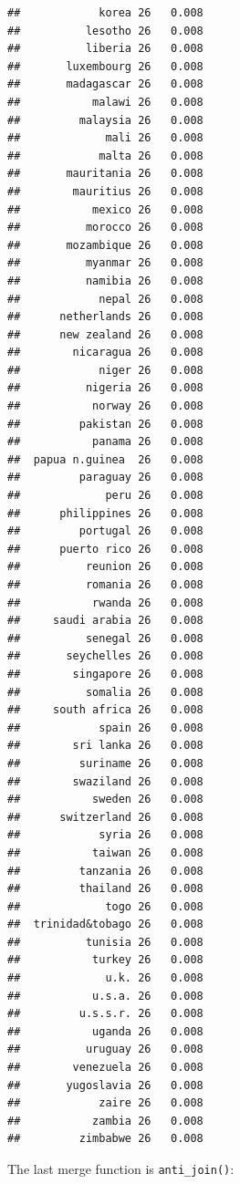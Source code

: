 \documentclass[]{gitbook}
\newenvironment{Shaded}{\begin{snugshade}}{\end{snugshade}}
\newcommand{\DataTypeTok}[1]{\textcolor[rgb]{0.13,0.29,0.53}{#1}}
\newcommand{\KeywordTok}[1]{\textcolor[rgb]{0.13,0.29,0.53}{\textbf{#1}}}
\newcommand{\NormalTok}[1]{#1}
\newcommand{\OperatorTok}[1]{\textcolor[rgb]{0.81,0.36,0.00}{\textbf{#1}}}
\newcommand{\StringTok}[1]{\textcolor[rgb]{0.31,0.60,0.02}{#1}}
\begin{document}
\begin{verbatim}
##            korea 26   0.008
##          lesotho 26   0.008
##          liberia 26   0.008
##       luxembourg 26   0.008
##       madagascar 26   0.008
##           malawi 26   0.008
##         malaysia 26   0.008
##             mali 26   0.008
##            malta 26   0.008
##       mauritania 26   0.008
##        mauritius 26   0.008
##           mexico 26   0.008
##          morocco 26   0.008
##       mozambique 26   0.008
##          myanmar 26   0.008
##          namibia 26   0.008
##            nepal 26   0.008
##      netherlands 26   0.008
##      new zealand 26   0.008
##        nicaragua 26   0.008
##            niger 26   0.008
##          nigeria 26   0.008
##           norway 26   0.008
##         pakistan 26   0.008
##           panama 26   0.008
##  papua n.guinea  26   0.008
##         paraguay 26   0.008
##             peru 26   0.008
##      philippines 26   0.008
##         portugal 26   0.008
##      puerto rico 26   0.008
##          reunion 26   0.008
##          romania 26   0.008
##           rwanda 26   0.008
##     saudi arabia 26   0.008
##          senegal 26   0.008
##       seychelles 26   0.008
##        singapore 26   0.008
##          somalia 26   0.008
##     south africa 26   0.008
##            spain 26   0.008
##        sri lanka 26   0.008
##         suriname 26   0.008
##        swaziland 26   0.008
##           sweden 26   0.008
##      switzerland 26   0.008
##            syria 26   0.008
##           taiwan 26   0.008
##         tanzania 26   0.008
##         thailand 26   0.008
##             togo 26   0.008
##  trinidad&tobago 26   0.008
##          tunisia 26   0.008
##           turkey 26   0.008
##             u.k. 26   0.008
##           u.s.a. 26   0.008
##         u.s.s.r. 26   0.008
##           uganda 26   0.008
##          uruguay 26   0.008
##        venezuela 26   0.008
##       yugoslavia 26   0.008
##            zaire 26   0.008
##           zambia 26   0.008
##         zimbabwe 26   0.008
\end{verbatim}

The last merge function is \texttt{anti\_join()}:

\begin{Shaded}
\end{Shaded}
\end{document}
